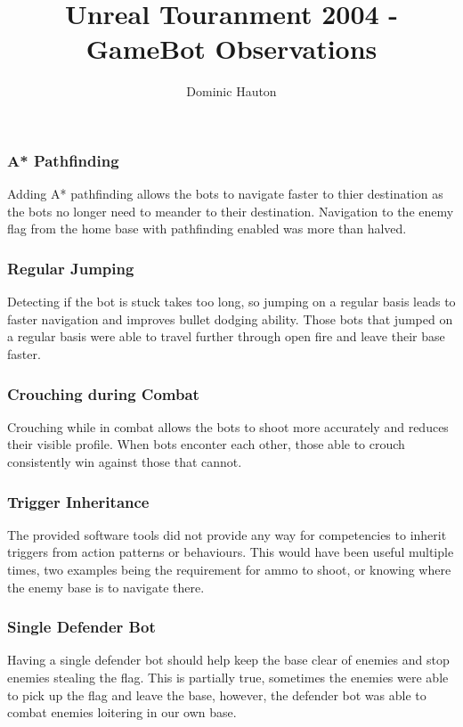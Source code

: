 \documentclass[a4paper,12pt,twocolumn]{report}
\title{Unreal Touranment 2004 - GameBot Observations}
\author{Dominic Hauton}
\begin{document}
\maketitle

\subsubsection{A* Pathfinding}
Adding A* pathfinding allows the bots to navigate faster to thier destination as the bots no longer need to meander to their destination. Navigation to the enemy flag from the home base with pathfinding enabled was more than halved. 

\subsubsection{Regular Jumping}
Detecting if the bot is stuck takes too long, so jumping on a regular basis leads to faster navigation and improves bullet dodging ability. Those bots that jumped on a regular basis were able to travel further through open fire and leave their base faster.

\subsubsection{Crouching during Combat}
Crouching while in combat allows the bots to shoot more accurately and reduces their visible profile. When bots enconter each other, those able to crouch consistently win against those that cannot.

\subsubsection{Trigger Inheritance}
The provided software tools did not provide any way for competencies to inherit triggers from action patterns or behaviours. This would have been useful multiple times, two examples being the requirement for ammo to shoot, or knowing where the enemy base is to navigate there.

\subsubsection{Single Defender Bot}
Having a single defender bot should help keep the base clear of enemies and stop enemies stealing the flag. This is partially true, sometimes the enemies were able to pick up the flag and leave the base, however, the defender bot was able to combat enemies loitering in our own base.
\end{document}

